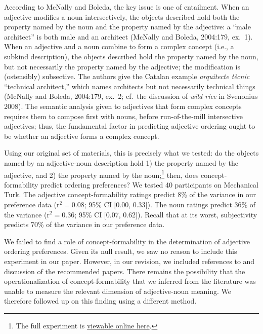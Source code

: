 \documentclass[12pt]{article}
\begin{document}
According to McNally and Boleda, the key issue is one of entailment. When an adjective modifies a noun intersectively, the objects described hold both the property named by the noun and the property named by the adjective: a ``male architect'' is both male and an architect (McNally and Boleda, 2004:179, ex.~1). When an adjective and a noun combine to form a complex concept (i.e., a subkind description), the objects described hold the property named by the noun, but not necessarily the property named by the adjective; the modification is (ostensibly) subsective. The authors give the Catalan example \emph{arquitecte t\`{e}cnic} ``technical architect,'' which names architects but not necessarily technical things (McNally and Boleda, 2004:179, ex.~2; cf.~the discussion of \emph{wild rice} in Svenonius 2008). The semantic analysis given to adjectives that form complex concepts requires them to compose first with nouns, before run-of-the-mill intersective adjectives; thus, the fundamental factor in predicting adjective ordering ought to be whether an adjective forms a complex concept.

Using our original set of materials, this is precisely what we tested: do the objects named by an adjective-noun description hold 1) the property named by the adjective, and 2) the property named by the noun;\footnote{The full experiment is \href{http://web.stanford.edu/~scontras/adjective_ordering/experiments/9-concept-formability/concept-formability.html}{viewable online here}.} then, does concept-formability predict ordering preferences? We tested 40 participants on Mechanical Turk. The adjective concept-formability ratings predict 8\% of the variance in our preference data (r$^{2}=0.08$; 95\% CI [0.00,  0.33]). The noun ratings predict 36\% of the variance (r$^{2}=0.36$; 95\% CI [0.07,  0.62]). Recall that at its worst, subjectivity predicts 70\% of the variance in our preference data.

We failed to find a role of concept-formability in the determination of adjective ordering preferences. Given its null result, we saw no reason to include this experiment in our paper. However, in our revision, we included references to and discussion of the recommended papers. 
There remains the possibility that the operationalization of concept-formability that we inferred from the literature was unable to measure the relevant dimension of adjective-noun meaning. We therefore followed up on this finding using a different method. 
\end{document}
